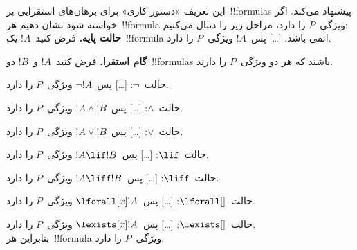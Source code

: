 \documentclass[../../../include/open-logic-section]{subfiles}
\begin{document}
\begin{explain}
این تعریف «دستور کاری» برای برهان‌های استقرایی بر~!!{formula}s پیشنهاد
می‌کند. اگر خواسته شود نشان دهیم هر~!!{formula} ویژگی~$P$ را دارد، مراحل
زیر را دنبال می‌کنیم:\\

\textbf{حالت پایه.} فرض کنید~$!A$ یک~!!{formula} اتمی باشد. [\ldots]
پس~$!A$ ویژگی~$P$ را دارد.

\textbf{گام استقرا.} فرض کنید~$!A$ و~$!B$ دو~!!{formula}s باشند که هر
دو ویژگی~$P$ را دارند.

حالت~$\lnot$: [\ldots] پس~$\lnot !A$ ویژگی~$P$ را دارد.

حالت~$\land$: [\ldots] پس~$!A \land !B$ ویژگی~$P$ را دارد.

حالت~$\lor$: [\ldots] پس~$!A \lor !B$ ویژگی~$P$ را دارد.

حالت~$\lif$: [\ldots] پس~$!A \lif !B$ ویژگی~$P$ را دارد.

حالت~$\liff$: [\ldots] پس~$!A \liff !B$ ویژگی~$P$ را دارد.

حالت~$\lforall[]$: [\ldots] پس~$\lforall[x] !A$ ویژگی~$P$ را دارد.

حالت~$\lexists[]$: [\ldots] پس~$\lexists[x] !A$ ویژگی~$P$ را دارد. \\

بنابراین هر~!!{formula} ویژگی~$P$ را دارد.
\end{explain}
\end{document}
